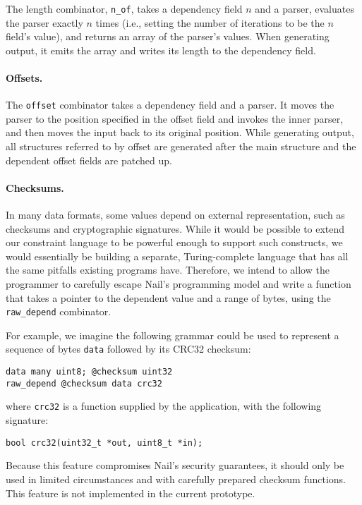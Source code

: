 The length combinator, \texttt{n_of}, takes a dependency field $n$
and a parser, evaluates the parser exactly $n$ times (i.e., setting
the number of iterations to be the $n$ field's value), and returns
an array of the parser's values. When generating output, it emits
the array and writes its length to the dependency field.

\paragraph{Offsets.}

The \texttt{offset} combinator takes a dependency field and a parser. It
moves the parser to the position specified in the offset field and
invokes the inner parser, and then moves the input back to its original
position.  While generating output, all structures referred to by offset
are generated after the main structure and the dependent offset fields
are patched up.

\paragraph{Checksums.}

In many data formats, some values depend on external representation,
such as checksums and cryptographic signatures.  While it would be
possible to extend our constraint language to be powerful enough to
support such constructs, we would essentially be building a separate,
Turing-complete language that has all the same pitfalls existing programs
have.  Therefore, we intend to allow the programmer to carefully escape
Nail's programming model and write a function that takes a pointer to
the dependent value and a range of bytes, using the \texttt{raw_depend}
combinator.

For example, we imagine the following grammar could be used to represent
a sequence of bytes \texttt{data} followed by its CRC32 checksum:

\begin{verbatim}
data many uint8; @checksum uint32
raw_depend @checksum data crc32
\end{verbatim}

\noindent
where \texttt{crc32} is a function supplied by the application, with
the following signature:

\begin{verbatim}
bool crc32(uint32_t *out, uint8_t *in);
\end{verbatim}

Because this feature compromises Nail's security guarantees, it should
only be used in limited circumstances and with carefully prepared checksum
functions.  This feature is not implemented in the current prototype.

